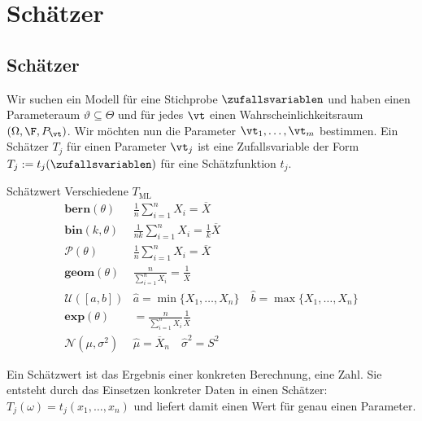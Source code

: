 
\section{Schätzer}
\subsection{Schätzer}
Wir suchen ein Modell für eine Stichprobe $\zufallsvariablen$ und haben einen
Parameteraum $\vartheta \subseteq \varTheta$ und für jedes $\vt$ einen
Wahrscheinlichkeitsraum $ (\Omega, \F, P_\vt)$. Wir möchten nun die Parameter
$\vt_1, \dots, \vt_m$ bestimmen. Ein Schätzer $T_j$ für einen Parameter $\vt_j$
ist eine Zufallsvariable der Form $T_j := t_j (\zufallsvariablen)$ für eine
Schätzfunktion $t_j$.
\begin{definition}{Schätzwert}
Verschiedene $T_{\text{ML}}$
\begin{equation*}
	\begin{array}{cc}
		\textbf{bern} (\theta) & \frac{1}{n} \sum_{i=1}^{n} X_i = \overline{X}\\[5pt]
		\textbf{bin} (k,\theta) & \frac{1}{nk} \sum_{i=1}^{n} X_i = \frac{1}{k} \overline{X} \\[5pt]
		\mathcal{P} (\theta) & \frac{1}{n} \sum_{i=1}^{n} X_i = \overline{X}\\[5pt]
		\textbf{geom}(\theta) & \frac{n}{\sum_{i=1}^{n} X_i} = \frac{1}{\overline{X}} \\[10pt]
		\mathcal{U}([a,b]) & \hat{a} = \min\{X_1, \ldots , X_n\} \quad \hat{b}= \max\{X_1, \ldots , X_n\}\\[5pt]
		\textbf{exp}(\theta) &  = \frac{n}{\sum_{i=1}^{n} X_i} \frac{1}{\overline{X}} \\[5pt]
		\mathcal{N}(\mu, \sigma^2) & \hat{\mu} = \overline{X}_n \quad \hat{\sigma}^2 = S^2
	\end{array}
\end{equation*}
\end{definition}

Ein Schätzwert ist das Ergebnis einer konkreten Berechnung, eine Zahl. Sie
entsteht durch das Einsetzen konkreter Daten in einen Schätzer: $T_j (\omega) =
  t_j (x_1, \dots, x_n)$ und liefert damit einen Wert für genau einen Parameter.
